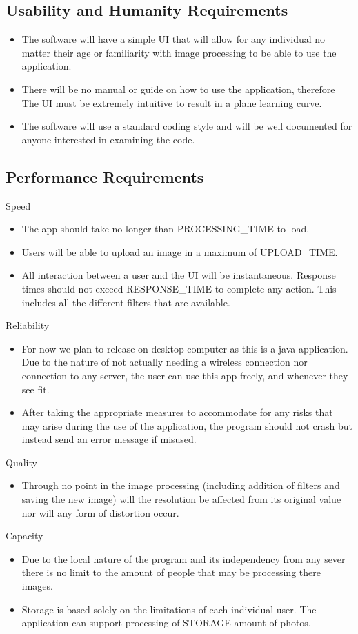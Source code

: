 \documentclass[12pt, titlepage]{article}
\begin{document}
\subsection{Usability and Humanity Requirements}
\begin{itemize}
\item The software will have a simple UI that will allow for any individual no matter their age or familiarity with image processing to be able to use the application.
\item There will be no manual or guide on how to use the application, therefore The UI must be extremely intuitive to result in a plane learning curve.
\item The software will use a standard coding style and will be well documented for anyone interested in examining the code.
\end{itemize}

\subsection{Performance Requirements}
Speed
\begin{itemize}
\item The app should take no longer than PROCESSING_TIME to load.
\item Users will be able to upload an image in a maximum of UPLOAD_TIME.
\item All interaction between a user and the UI will be instantaneous. Response times should not exceed RESPONSE_TIME to complete any action. This includes all the different filters that are available.
\end{itemize}
Reliability
\begin{itemize}
\item For now we plan to release on desktop computer as this is a java application. Due to the nature of not actually needing a wireless connection nor connection to any server, the user can use this app freely, and whenever they see fit.
\item After taking the appropriate measures to accommodate for any risks that may arise during the use of the application, the program should not crash but instead send an error message if misused.
\end{itemize}
Quality
\begin{itemize}
\item Through no point in the image processing (including addition of filters and saving the new image) will the resolution be affected from its original value nor will any form of distortion occur.
\end{itemize}
Capacity
\begin{itemize}
\item Due to the local nature of the program and its independency from any sever there is no limit to the amount of people that may be processing there images.
\item Storage is based solely on the limitations of each individual user. The application can support processing of STORAGE amount of photos.
\end{itemize}
\end{document}
